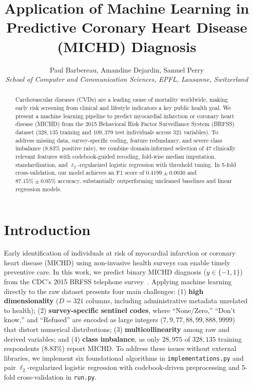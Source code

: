 \documentclass[10pt,conference,compsocconf]{IEEEtran}
\begin{document}
\title{Application of Machine Learning in Predictive Coronary Heart Disease (MICHD) Diagnosis}

\author{Paul Barbereau, Amandine Dejardin, Samuel Perry\\
\textit{School of Computer and Communication Sciences, EPFL, Lausanne, Switzerland}}

\maketitle

\begin{abstract}
Cardiovascular diseases (CVDs) are a leading cause of mortality worldwide, making early risk screening from clinical and lifestyle indicators a key public health goal. We present a machine learning pipeline to predict myocardial infarction or coronary heart disease (MICHD) from the 2015 Behavioral Risk Factor Surveillance System (BRFSS) dataset ($328{,}135$ training and $109{,}379$ test individuals across $321$ variables). To address missing data, survey-specific coding, feature redundancy, and severe class imbalance ($8.83\%$ positive rate), we combine domain-informed selection of $47$ clinically relevant features with codebook-guided recoding, fold-wise median imputation, standardization, and $\ell_2$-regularized logistic regression with threshold tuning. In 5-fold cross-validation, our model achieves an F1 score of $0.4199 \pm 0.0030$ and $87.15\% \pm 0.05\%$ accuracy, substantially outperforming uncleaned baselines and linear regression models.
\end{abstract}

\section{Introduction}
Early identification of individuals at risk of myocardial infarction or coronary heart disease (MICHD) using non-invasive health surveys can enable timely preventive care. In this work, we predict binary MICHD diagnosis ($y \in \{-1, 1\}$) from the CDC's 2015 BRFSS telephone survey~\cite{cdc_brfss_codebook_2015}. Applying machine learning directly to the raw dataset presents four main challenges: (1) \textbf{high dimensionality} ($D = 321$ columns, including administrative metadata unrelated to health); (2) \textbf{survey-specific sentinel codes}, where ``None/Zero,'' ``Don't know,'' and ``Refused'' are encoded as large integers ($7, 9, 77, 88, 99, 888, 9999$) that distort numerical distributions; (3) \textbf{multicollinearity} among raw and derived variables; and (4) \textbf{class imbalance}, as only $28{,}975$ of $328{,}135$ training respondents ($8.83\%$) report MICHD. To address these issues without external libraries, we implement six foundational algorithms in \texttt{implementations.py} and pair $\ell_2$-regularized logistic regression with codebook-driven preprocessing and 5-fold cross-validation in \texttt{run.py}.
\end{document}
